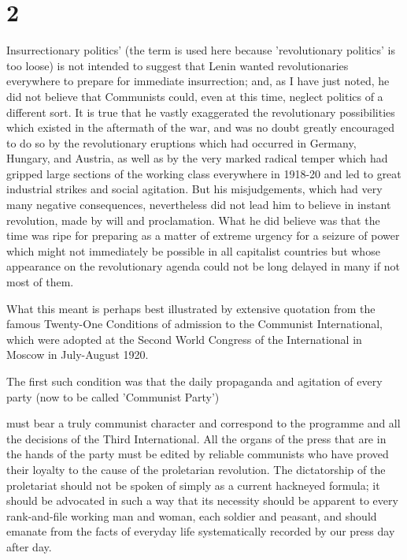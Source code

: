 \section*{2}
Insurrectionary politics' (the term is used here because 'revolutionary politics' is too loose) is not intended to suggest that Lenin wanted revolutionaries everywhere to prepare for immediate insurrection; and, as I have just noted, he did not believe that Communists could, even at this time, neglect politics of a different sort. It is true that he vastly exaggerated the revolutionary possibilities which existed in the aftermath of the war, and was no doubt greatly encouraged to do so by the revolutionary eruptions which had occurred in Germany, Hungary, and Austria, as well as by the very marked radical temper which had gripped large sections of the working class everywhere in 1918-20 and led to great industrial strikes and social agitation. But his misjudgements, which had very many negative consequences, nevertheless did not lead him to believe in instant revolution, made by will and proclamation. What he did  believe was that the time was ripe for preparing as a matter of extreme urgency for a seizure of power which might not immediately be possible in all capitalist countries but whose appearance on the revolutionary agenda could not be long delayed in many if not most of them.

What this meant is perhaps best illustrated by extensive quotation from the famous Twenty-One Conditions of admission to the Communist International, which were adopted at the Second World Congress of the International in Moscow in July\hyp{}August 1920.

The first such condition was that the daily propaganda and agitation of every party (now to be called 'Communist Party')
\begin{displayquote}
    must bear a truly communist character and correspond to the programme and all the decisions of the Third International. All the organs of the press that are in the hands of the party must be edited by reliable communists who have proved their loyalty to the cause of the proletarian revolution. The dictatorship of the proletariat should not be spoken of simply as a current hackneyed formula; it should be advocated in such a way that its necessity should be apparent to every rank-and-file working man and woman, each soldier and peasant, and should emanate from the facts of everyday life systematically recorded by our press day after day.
\end{displayquote}

